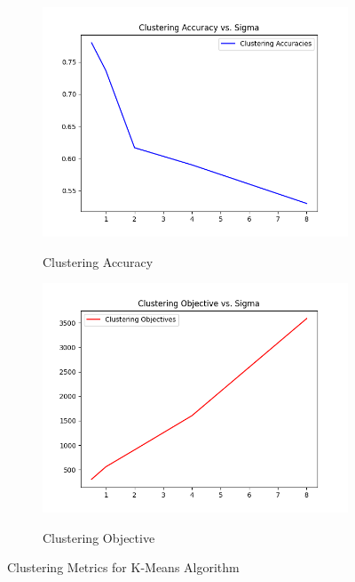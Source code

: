 \documentclass[a4paper]{article}
\newcounter{thm}
\theoremstyle{definition}
\newenvironment{soln}{
    \leavevmode\color{blue}\ignorespaces
}{}
\begin{document}
\begin{soln}
    \begin{figure}[h]
        \centering
        \begin{subfigure}{0.5\textwidth}
            \includegraphics[width=1.1\linewidth]{clustering_accuracy.png}
            \label{fig:1a}
            \caption{Clustering Accuracy}
        \end{subfigure}%
        \begin{subfigure}{0.5\textwidth}
            \includegraphics[width=1.1\linewidth]{clustering_objective.png}
            \label{fig:1b}
            \caption{Clustering Objective}
        \end{subfigure}
        \caption{Clustering Metrics for K-Means Algorithm}
        \label{fig:clust}
    \end{figure}
\end{soln}
\end{document}
